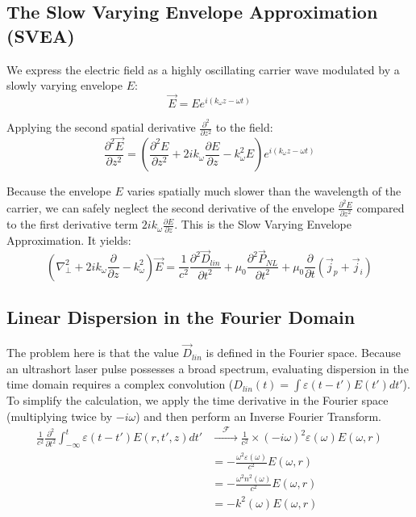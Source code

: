 \documentclass[11pt,a4paper]{article}
\begin{document}
\subsection*{The Slow Varying Envelope Approximation (SVEA)}
We express the electric field as a highly oscillating carrier wave modulated by a slowly varying envelope $E$:
\begin{equation*}
\vec{E} = Ee^{i(k_{\omega}z-\omega t)}
\end{equation*}

Applying the second spatial derivative $\frac{\partial^2}{\partial z^2}$ to the field:
\begin{equation}
\frac{\partial^2 \vec{E}}{\partial z^2} = \left( \frac{\partial^2 E}{\partial z^2} + 2 i k_\omega \frac{\partial E}{\partial z} - k_\omega^2 E \right) e^{i(k_\omega z - \omega t)}
\end{equation}

Because the envelope $E$ varies spatially much slower than the wavelength of the carrier, we can safely neglect the second derivative of the envelope $\frac{\partial^2 E}{\partial z^2}$ compared to the first derivative term $2 i k_\omega \frac{\partial E}{\partial z}$. This is the Slow Varying Envelope Approximation. It yields:
\begin{equation}
\left( \nabla_\perp^2 + 2 i k_{\omega} \frac{\partial}{\partial z} - k_{\omega}^2 \right) \vec{E} = \frac{1}{c^2} \frac{\partial^2 \vec{D}_{lin}}{\partial t^2} + \mu_0 \frac{\partial^2 \vec{P}_{NL}}{\partial t^2} + \mu_0 \frac{\partial}{\partial t} (\vec{j}_p + \vec{j}_i)
\end{equation}

\subsection*{Linear Dispersion in the Fourier Domain}
The problem here is that the value $\vec{D}_{lin}$ is defined in the Fourier space. Because an ultrashort laser pulse possesses a broad spectrum, evaluating dispersion in the time domain requires a complex convolution ($D_{lin}(t) = \int \varepsilon(t-t') E(t') dt'$). To simplify the calculation, we apply the time derivative in the Fourier space (multiplying twice by $-i\omega$) and then perform an Inverse Fourier Transform.
\begin{align}
\frac{1}{c^2} \frac{\partial^2}{\partial t^2} \int_{-\infty}^{t} \varepsilon(t-t') E(r, t', z) dt' &\xrightarrow{\quad \mathcal{F} \quad} \frac{1}{c^2} \times (-i\omega)^2 \varepsilon(\omega) E(\omega, r) \nonumber \\
&= -\frac{\omega^2 \varepsilon(\omega)}{c^2} E(\omega, r) \nonumber \\
&= -\frac{\omega^2 n^2(\omega)}{c^2} E(\omega, r) \nonumber \\
&= -k^2(\omega) E(\omega, r)
\end{align}
\end{document}
